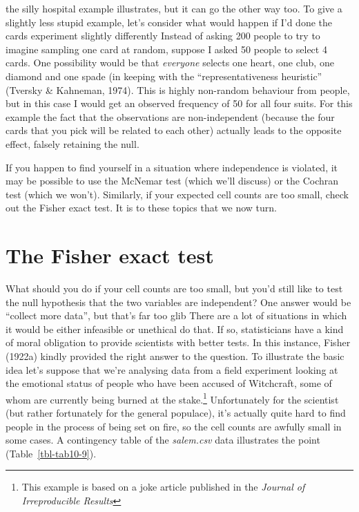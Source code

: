 \documentclass[
  a4paper,
]{book}
\begin{document}
\begin{itemize}
  the silly hospital example illustrates, but it can go the other way
  too. To give a slightly less stupid example, let's consider what would
  happen if I'd done the cards experiment slightly differently Instead
  of asking 200 people to try to imagine sampling one card at random,
  suppose I asked 50 people to select 4 cards. One possibility would be
  that \emph{everyone} selects one heart, one club, one diamond and one
  spade (in keeping with the ``representativeness heuristic'' (Tversky
  \& Kahneman, 1974). This is highly non-random behaviour from people,
  but in this case I would get an observed frequency of 50 for all four
  suits. For this example the fact that the observations are
  non-independent (because the four cards that you pick will be related
  to each other) actually leads to the opposite effect, falsely
  retaining the null.
\end{itemize}

If you happen to find yourself in a situation where independence is
violated, it may be possible to use the McNemar test (which we'll
discuss) or the Cochran test (which we won't). Similarly, if your
expected cell counts are too small, check out the Fisher exact test. It
is to these topics that we now turn.

\hypertarget{the-fisher-exact-test}{%
\section{The Fisher exact test}\label{the-fisher-exact-test}}

What should you do if your cell counts are too small, but you'd still
like to test the null hypothesis that the two variables are independent?
One answer would be ``collect more data'', but that's far too glib There
are a lot of situations in which it would be either infeasible or
unethical do that. If so, statisticians have a kind of moral obligation
to provide scientists with better tests. In this instance, Fisher
(1922a) kindly provided the right answer to the question. To illustrate
the basic idea let's suppose that we're analysing data from a field
experiment looking at the emotional status of people who have been
accused of Witchcraft, some of whom are currently being burned at the
stake.\footnote{This example is based on a joke article published in the
  \emph{Journal of Irreproducible Results}} Unfortunately for the
scientist (but rather fortunately for the general populace), it's
actually quite hard to find people in the process of being set on fire,
so the cell counts are awfully small in some cases. A contingency table
of the \emph{salem.csv} data illustrates the point
(Table~\ref{tbl-tab10-9}).
\end{document}

